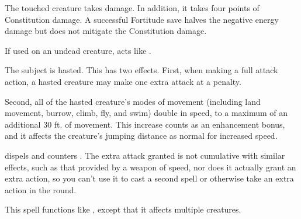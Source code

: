 \spellrng{\rngtouch}
\begin{spelleffect}
  The touched creature takes damage. In addition, it takes four points of Constitution damage. A successful Fortitude save halves the negative energy damage but does not mitigate the Constitution damage.
\end{spelleffect}
\begin{spellnotes}
  If used on an undead creature,  acts like .
\end{spellnotes}

\spelldur{\durshort}
\begin{spelleffect}
  The subject is hasted. This has two effects. First, when making a full attack action, a hasted creature may make one extra attack at a  penalty.
  \par Second, all of the hasted creature's modes of movement (including land movement, burrow, climb, fly, and swim) double in speed, to a maximum of an additional 30 ft. of movement. This increase counts as an enhancement bonus, and it affects the creature's jumping distance as normal for increased speed.
\end{spelleffect}
\begin{spellnotes}
   dispels and counters . The extra attack granted is not cumulative with similar effects, such as that provided by a weapon of speed, nor does it actually grant an extra action, so you can't use it to cast a second spell or otherwise take an extra action in the round.
\end{spellnotes}

\begin{spelleffect}
  This spell functions like , except that it affects multiple creatures.
\end{spelleffect}


